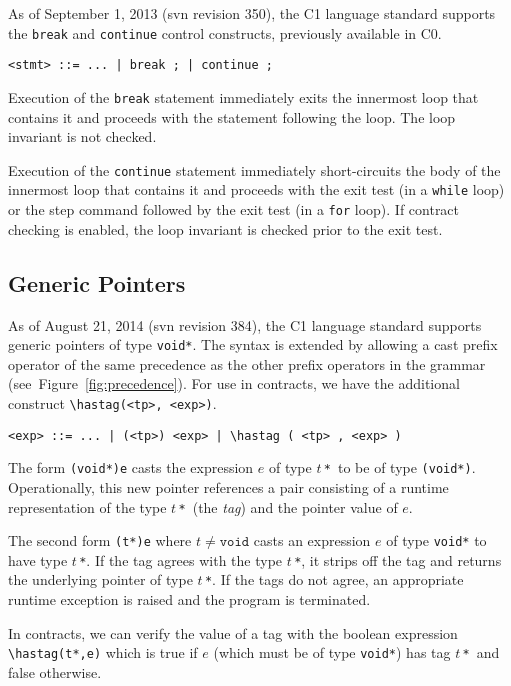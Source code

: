 \documentclass[11pt]{article}
\newcommand{\tstar}{\texttt{*}}
\newcommand{\tvoid}{\texttt{void}}
\begin{document}
As of September 1, 2013 (svn revision 350), the C1 language standard
supports the \lstinline'break' and \lstinline'continue' control constructs,
previously available in C0.
\begin{lstlisting}[basicstyle=\smallbasicstyle]
<stmt> ::= ... | break ; | continue ;
\end{lstlisting}

Execution of the \lstinline'break' statement immediately exits the
innermost loop that contains it and proceeds with the statement
following the loop. The loop invariant is not checked.

Execution of the \lstinline'continue' statement immediately short-circuits
the body of the innermost loop that contains it and proceeds with the
exit test (in a \lstinline'while' loop) or the step command followed by the
exit test (in a \lstinline'for' loop). If contract checking is enabled,
the loop invariant is checked prior to the exit test.

\subsection{Generic Pointers}

As of August 21, 2014 (svn revision 384), the C1 language standard
supports generic pointers of type \lstinline'void*'.  The syntax is
extended by allowing a cast prefix operator of the same precedence as
the other prefix operators in the grammar
(see~Figure~\ref{fig:precedence}).  For use in contracts, we have the
additional construct \lstinline'\hastag(<tp>, <exp>)'.
\begin{lstlisting}[basicstyle=\smallbasicstyle]
<exp> ::= ... | (<tp>) <exp> | \hastag ( <tp> , <exp> )
\end{lstlisting}
The form \lstinline'(void*)e' casts the expression $e$ of type $t$\,\tstar\
to be of type \lstinline'(void*)'.  Operationally, this new pointer
references a pair consisting of a runtime representation of the type
$t$\,\tstar\ (the \emph{tag}) and the pointer value of $e$.

The second form \lstinline'(t*)e' where $t \not= \tvoid$ casts an
expression $e$ of type \lstinline'void*' to have type $t$\,\tstar.  If the
tag agrees with the type $t$\,\tstar, it strips off the tag and
returns the underlying pointer of type $t$\,\tstar.  If the tags do
not agree, an appropriate runtime exception is raised and the program
is terminated.

In contracts, we can verify the value of a tag with the boolean
expression \lstinline'\hastag(t*,e)' which is true if $e$ (which must be of
type \lstinline'void*') has tag $t$\,\tstar\ and false otherwise.
\end{document}
